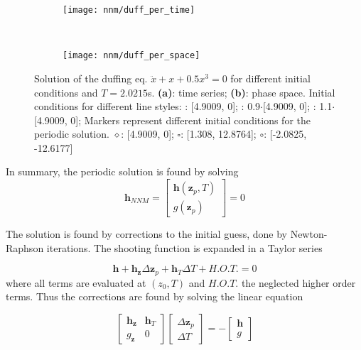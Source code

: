 \begin{figure}[!ht]
  \centering
  \begin{subfigure}[b]{0.45\textwidth}
    \texttt{[image: nnm/duff\_per\_time]}
  \end{subfigure}
  ~
  \begin{subfigure}[b]{0.45\textwidth}
    \texttt{[image: nnm/duff\_per\_space]}
  \end{subfigure}
  \caption{Solution of the duffing eq. $\ddot x + x + 0.5x^3=0$ for different
    initial conditions and $T=2.0215$s.
    \textbf{(a)}: time series;
    \textbf{(b)}: phase space.
    Initial conditions for different line styles:
    \sampleline{}: [4.9009, 0];
    : 0.9$\cdot$[4.9009, 0];
    : 1.1$\cdot$[4.9009, 0];
    Markers represent different initial conditions for the periodic solution.
    $\diamond$: [4.9009, 0];
    $\square$: [1.308, 12.8764];
    $\circ$: [-2.0825, -12.6177]
  }
  \label{fig:sm_phase}
\end{figure}


In summary, the periodic solution is found by solving
\begin{equation}
  \label{eq:sm_bvp_problem}
  \bm h_{NNM} =
  \begin{bmatrix}
    \bm h(\bm z_{p}, T) \\
    g(\bm z_{p} )
  \end{bmatrix}
  = 0
\end{equation}

The solution is found by corrections to the initial guess, done by
Newton-Raphson iterations. The shooting function is expanded in a Taylor series

\begin{equation}
  \label{eq:sm_nr}
  \bm h +
  \bm h_{\bm z} \Delta \bm z_{p} +
  \bm h_{T} \Delta T
  + H.O.T. = 0
\end{equation}
where all terms are evaluated at $(z_0,T)$ and $H.O.T.$ the neglected higher
order terms. Thus the corrections are found by solving the linear equation

\begin{equation}
  \label{eq:sm_nr_sol}
  \begin{bmatrix}
    \bm h_{\bm z} & \bm h_{T} \\
    g_{\bm z} & 0
  \end{bmatrix}
  \begin{bmatrix}
    \Delta \bm z_{p} \\
    \Delta T
  \end{bmatrix}
  = -
  \begin{bmatrix}
    \bm h \\
    g
  \end{bmatrix}
\end{equation}

